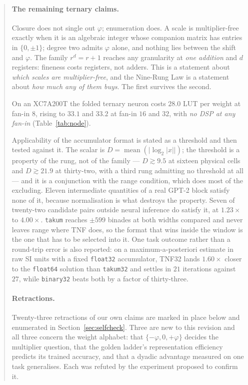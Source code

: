 \begin{abstract}
\paragraph{The remaining ternary claims.}
Closure does not single out $\varphi$; enumeration does. A scale is
multiplier-free exactly when it is an algebraic integer whose companion matrix
has entries in $\{0,\pm1\}$; degree two admits $\varphi$ alone, and nothing lies
between the shift and $\varphi$. The family $r^d=r+1$ reaches any granularity at
\emph{one addition} and $d$ registers: fineness costs registers, not adders. This
is a statement about \emph{which scales are multiplier-free}, and the Nine-Rung
Law is a statement about \emph{how much any of them buys}. The first survives the
second.

On an XC7A200T the folded ternary neuron costs $28.0$ LUT per weight at fan-in
$8$, rising to $33.1$ and $33.2$ at fan-in $16$ and $32$, with \emph{no DSP at
any fan-in} (Table~\ref{tab:node}).

Applicability of the accumulator format is stated as a threshold and then tested
against it. The scalar is $D=\operatorname{mean}(\lvert\log_2|x|\rvert)$; the
threshold is a property of the rung, not of the family --- $D \gtrsim 9.5$ at
sixteen physical cells and $D \gtrsim 21.9$ at thirty-two, with a third rung
admitting no threshold at all --- and it is a conjunction with the range
condition, which does most of the excluding. Eleven intermediate quantities of a
real GPT-2 block satisfy none of it, because normalisation is what destroys the
property. Seven of twenty-two candidate pairs outside neural inference do satisfy
it, at $1.23\times$ to $4.00\times$. \texttt{takum} reaches $\pm 599$ binades at
both widths compared and never leaves range where TNF does, so the format that
wins inside the window is the one that has to be selected into it. One task
outcome rather than a round-trip error is also reported: on a
maximum-a-posteriori estimate in raw SI units with a fixed \texttt{float32}
accumulator, TNF32 lands $1.60\times$ closer to the \texttt{float64} solution than
\texttt{takum32} and settles in $21$ iterations against $27$, while
\texttt{binary32} beats both by a factor of thirty-three.

\paragraph{Retractions.}
Twenty-three retractions of our own claims are marked in place below and
enumerated in Section~\ref{sec:selfcheck}. Three are new to this revision and all
three concern the weight alphabet: that $\{-\varphi,0,+\varphi\}$ decides the
multiplier question, that the golden ladder's representation efficiency predicts
its trained accuracy, and that a dyadic advantage measured on one task
generalises. Each was refuted by the experiment proposed to confirm it.
\end{abstract}

